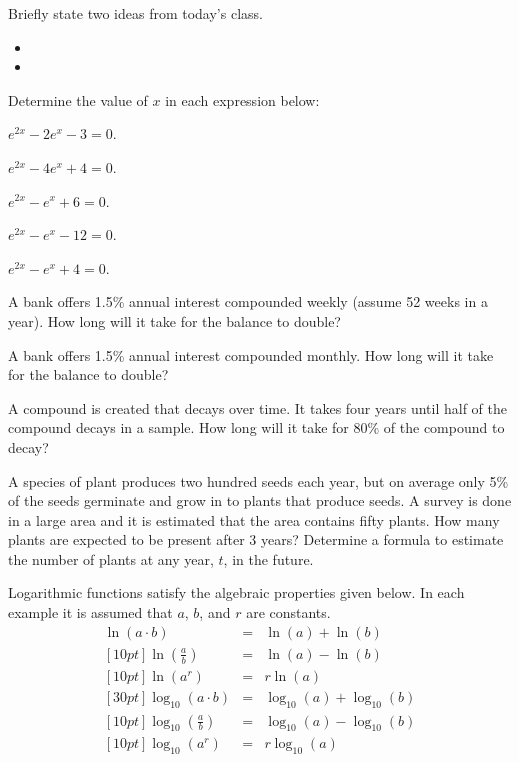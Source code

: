 \begin{problem}
\item Briefly state two ideas from today's class.
  \begin{itemize}
  \item
  \item
  \end{itemize}
\item Determine the value of $x$ in each expression below:
  \begin{subproblem}
  \item $e^{2x} - 2 e^{x} - 3 = 0$.
  \item $e^{2x} - 4 e^{x} + 4 = 0$.
  \item $e^{2x} -   e^{x} + 6 = 0$.
  \item $e^{2x} -   e^{x} - 12 = 0$.
  \item $e^{2x} - e^{x} + 4 = 0$.
  \end{subproblem}
\item A bank offers 1.5\% annual interest compounded weekly (assume 52
  weeks in a year). How long will it take for the balance to double?
\item A bank offers 1.5\% annual interest compounded monthly. How long
  will it take for the balance to double?
\item A compound is created that decays over time. It takes four years
  until half of the compound decays in a sample. How long will it take
  for 80\% of the compound to decay?
\item A species of plant produces two hundred seeds each year, but on average only 5\%
  of the seeds germinate and grow in to plants that produce seeds. A survey
  is done in a large area and it is estimated that the area contains fifty
  plants. How many plants are expected to be present after 3 years? Determine
  a formula to estimate the number of plants at any year, $t$, in the future.
\end{problem}




Logarithmic functions satisfy the algebraic properties given below. In
each example it is assumed that $a$, $b$, and $r$ are constants.
\begin{eqnarray}
  \ln(a\cdot b) & = & \ln(a) + \ln(b) \\ [10pt]
  \ln\left(\frac{a}{b}\right) & = & \ln(a) - \ln(b) \\  [10pt]
  \ln\left(a^r\right) & = & r \ln(a) \\ [30pt]
  \log_{10}(a\cdot b) & = & \log_{10}(a) + \log_{10}(b) \\ [10pt]
  \log_{10}\left(\frac{a}{b}\right) & = & \log_{10}(a) - \log_{10}(b) \\  [10pt]
  \log_{10}\left(a^r\right) & = & r \log_{10}(a)
\end{eqnarray}


